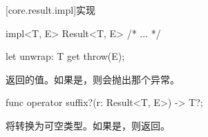 [core.result.impl]{实现}

\begin{itemdecl}
impl<T, E> Result<T, E> { /* ... */ }
\end{itemdecl}

\begin{itemdecl}
let unwrap: T { get throw(E); }
\end{itemdecl}

\pnum
{}返回的值。如果是，则会抛出那个异常。

\begin{itemdecl}
func operator suffix?(r: Result<T, E>) -> T?;
\end{itemdecl}

\pnum
{}将转换为可空类型。如果是，则返回。